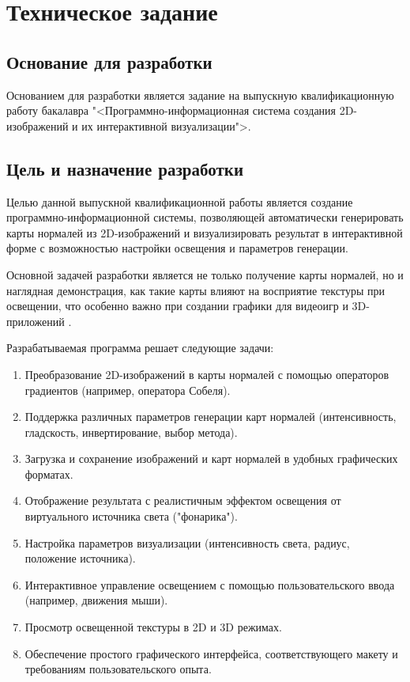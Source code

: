 \section{Техническое задание}
\subsection{Основание для разработки}

Основанием для разработки является задание на выпускную квалификационную работу бакалавра "<Программно-информационная система создания 2D-изображений и их интерактивной визуализации">.

\subsection{Цель и назначение разработки}

Целью данной выпускной квалификационной работы является создание программно-информационной системы, позволяющей автоматически генерировать карты нормалей из 2D-изображений и визуализировать результат в интерактивной форме с возможностью настройки освещения и параметров генерации.

Основной задачей разработки является не только получение карты нормалей, но и наглядная демонстрация, как такие карты влияют на восприятие текстуры при освещении, что особенно важно при создании графики для видеоигр и 3D-приложений \cite{matiz2020}.

Разрабатываемая программа решает следующие задачи:
\begin{enumerate}
	\item Преобразование 2D-изображений в карты нормалей с помощью операторов градиентов (например, оператора Собеля).
	\item Поддержка различных параметров генерации карт нормалей (интенсивность, гладскость, инвертирование, выбор метода).
	\item Загрузка и сохранение изображений и карт нормалей в удобных графических форматах.
	\item Отображение результата с реалистичным эффектом освещения от виртуального источника света ("фонарика").
	\item Настройка параметров визуализации (интенсивность света, радиус, положение источника).
	\item Интерактивное управление освещением с помощью пользовательского ввода (например, движения мыши).
	\item Просмотр освещенной текстуры в 2D и 3D режимах.
	\item Обеспечение простого графического интерфейса, соответствующего макету и требованиям пользовательского опыта.
\end{enumerate}
